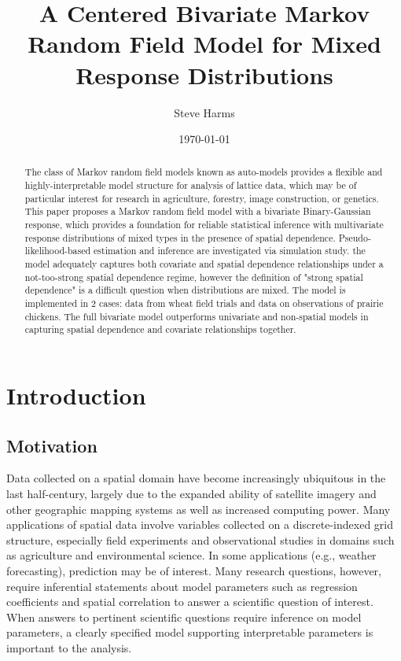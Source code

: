 \documentclass[12pt, a4paper, twoside]{article}
\author{Steve Harms}
\title{A Centered Bivariate Markov Random Field Model for Mixed Response Distributions}
\date{\today}
\begin{document}
\maketitle

\begin{abstract}
The class of Markov random field models known as auto-models provides a flexible and highly-interpretable model structure for analysis of lattice data, which may be of particular interest for research in agriculture, forestry, image construction, or genetics. This paper proposes a Markov random field model with a bivariate Binary-Gaussian response, which provides a foundation for reliable statistical inference with multivariate response distributions of mixed types in the presence of spatial dependence. Pseudo-likelihood-based estimation and inference are investigated via simulation study. the model adequately captures both covariate and spatial dependence relationships under a not-too-strong spatial dependence regime, however the definition of "strong spatial dependence" is a difficult question when distributions are mixed. The model is implemented in 2 cases: data from wheat field trials and data on observations of prairie chickens. The full bivariate model outperforms univariate and non-spatial models in capturing spatial dependence and covariate relationships together.
\end{abstract}
\newpage
\tableofcontents
\newpage
 \listoffigures
\listoftables
\newpage

\section{Introduction}\label{intro}
\subsection{Motivation}\label{motivation}
Data collected on a spatial domain have become increasingly ubiquitous in the last half-century, largely due to the expanded ability of satellite imagery and other geographic mapping systems as well as increased computing power. Many applications of spatial data involve variables collected on a discrete-indexed grid structure, especially field experiments and observational studies in domains such as agriculture and environmental science. In some applications (e.g., weather forecasting), prediction may be of interest. Many research questions, however, require inferential statements about model parameters such as regression coefficients and spatial correlation to answer a scientific question of interest. When answers to pertinent scientific questions require inference on model parameters, a clearly specified model supporting interpretable parameters is important to the analysis.
\end{document}
